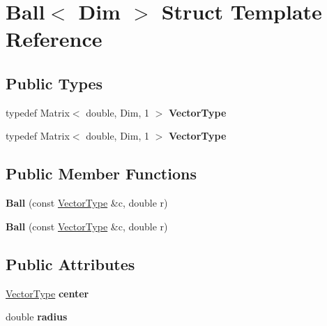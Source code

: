 \hypertarget{struct_ball}{}\section{Ball$<$ Dim $>$ Struct Template Reference}
\label{struct_ball}
\subsection*{Public Types}
\begin{DoxyCompactItemize}
\item 
\mbox{\label{struct_ball_a3d318edff49d37ca32fc699970718113}} 
typedef Matrix$<$ double, Dim, 1 $>$ {\bfseries Vector\+Type}
\item 
\mbox{\label{struct_ball_a3d318edff49d37ca32fc699970718113}} 
typedef Matrix$<$ double, Dim, 1 $>$ {\bfseries Vector\+Type}
\end{DoxyCompactItemize}
\subsection*{Public Member Functions}
\begin{DoxyCompactItemize}
\item 
\mbox{\label{struct_ball_affabc10f2563c739fb729d9cde392f35}} 
{\bfseries Ball} (const \hyperlink{struct_vector_type}{Vector\+Type} \&c, double r)
\item 
\mbox{\label{struct_ball_affabc10f2563c739fb729d9cde392f35}} 
{\bfseries Ball} (const \hyperlink{struct_vector_type}{Vector\+Type} \&c, double r)
\end{DoxyCompactItemize}
\subsection*{Public Attributes}
\begin{DoxyCompactItemize}
\item 
\mbox{\label{struct_ball_aeb262cac5acc2454e85f4c1e3c75d026}} 
\hyperlink{struct_vector_type}{Vector\+Type} {\bfseries center}
\item 
\mbox{\label{struct_ball_afa2b71ee0b889fe3b87386379a4ccbc9}} 
double {\bfseries radius}
\end{DoxyCompactItemize}


